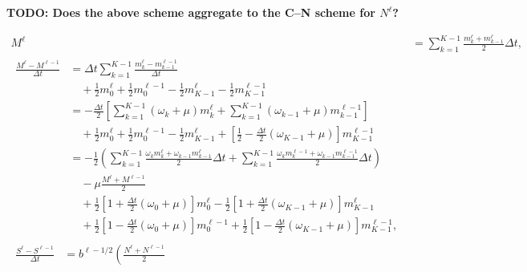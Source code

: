 \documentclass{jpmarticle}
\let\subequationsorig\subequations%
\let\endsubequationsorig\endsubequations%
\renewenvironment{subequations}{
  \subequationsorig
  \renewcommand{\theequation}{\theparentequation.\arabic{equation}}
}{
  \endsubequationsorig
}
\begin{document}
\textbf{TODO: Does the above scheme aggregate to the C–N scheme for
  $N^{\ell}$?}


\begin{subequations}
  \begin{align}
    M^{\ell}
    &=
    \sum_{k = 1}^{K - 1}
    \frac{m_k^{\ell} + m_{k - 1}^{\ell}}{2}
    \Delta t,
    \\
    \begin{split}
      \frac{M^{\ell}  - M^{\ell - 1}}{\Delta t}
      &=
      \Delta t
      \sum_{k = 1}^{K - 1}
      \frac{m_k^{\ell} - m_{k - 1}^{\ell - 1}}{\Delta t}
      \\ & \quad {}
      + \frac{1}{2} m_0^{\ell}
      + \frac{1}{2} m_0^{\ell - 1}
      - \frac{1}{2} m_{K - 1}^{\ell}
      - \frac{1}{2} m_{K - 1}^{\ell - 1}
      \\
      &= - \frac{\Delta t}{2}
      \left[
        \sum_{k = 1}^{K - 1} (\omega_k + \mu) m_k^{\ell}
        + \sum_{k = 1}^{K - 1} (\omega_{k - 1} + \mu) m_{k - 1}^{\ell - 1}
      \right]
      \\ & \quad {}
      + \frac{1}{2} m_0^{\ell}
      + \frac{1}{2} m_0^{\ell - 1}
      - \frac{1}{2} m_{K - 1}^{\ell}
      + \left[\frac{1}{2}
        - \frac{\Delta t}{2} (\omega_{K - 1} + \mu)\right]
      m_{K - 1}^{\ell - 1}
      \\
      &= - \frac{1}{2}
      \left(
        \sum_{k = 1}^{K - 1}
        \frac{\omega_k m_k^{\ell} + \omega_{k - 1} m_{k - 1}^{\ell}}{2}
        \Delta t
        + \sum_{k = 1}^{K - 1}
        \frac{\omega_k m_k^{\ell - 1} + \omega_{k - 1} m_{k - 1}^{\ell - 1}}{2}
        \Delta t
      \right)
      \\ & \quad {}
      - \mu \frac{M^{\ell} + M^{\ell - 1}}{2}
      \\ & \quad {}
      + \frac{1}{2} \left[
        1 + \frac{\Delta t}{2} (\omega_0 + \mu)
      \right] m_0^{\ell}
      - \frac{1}{2} \left[
        1 + \frac{\Delta t}{2} (\omega_{K - 1} + \mu)
      \right] m_{K - 1}^{\ell}
      \\ & \quad {}
      + \frac{1}{2} \left[
        1 - \frac{\Delta t}{2} (\omega_0 + \mu)
      \right] m_0^{\ell - 1}
      + \frac{1}{2} \left[
        1 - \frac{\Delta t}{2} (\omega_{K - 1} + \mu)
      \right] m_{K - 1}^{\ell - 1},
    \end{split}
    \\
    \begin{split}
      \frac{S^{\ell} - S^{\ell - 1}}{\Delta t} &=
      b^{\ell - 1 / 2} \left(\frac{N^{\ell} + N^{\ell - 1}}{2}

\end{split}
\end{align}
\end{subequations}
\end{document}
